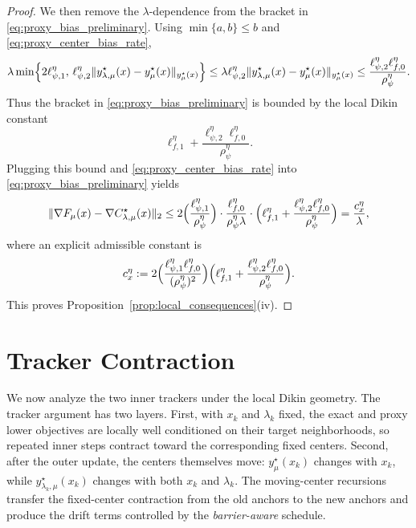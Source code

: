 \documentclass{article}
\begin{document}
\begin{proof}
\smallskip
\noindent We then remove the \(\lambda\)-dependence from the bracket in
\eqref{eq:proxy_bias_preliminary}.
Using \(\min\{a,b\}\le b\) and \eqref{eq:proxy_center_bias_rate},
\[
\lambda
\min\Bigl\{
2\ell_{\psi,1}^\eta,\,
\ell_{\psi,2}^\eta
\|y_{\lambda,\mu}^\star(x)-y_\mu^\star(x)\|_{y_\mu^\star(x)}
\Bigr\}
\le
\lambda\ell_{\psi,2}^\eta
\|y_{\lambda,\mu}^\star(x)-y_\mu^\star(x)\|_{y_\mu^\star(x)}
\le
\frac{\ell_{\psi,2}^\eta\ell_{f,0}^\eta}{\rho_\psi^\eta}.
\]
Thus the bracket in \eqref{eq:proxy_bias_preliminary} is bounded by the local Dikin constant
\[
\ell_{f,1}^\eta
+
\frac{\ell_{\psi,2}^\eta\ell_{f,0}^\eta}{\rho_\psi^\eta}.
\]
Plugging this bound and \eqref{eq:proxy_center_bias_rate} into
\eqref{eq:proxy_bias_preliminary} yields
\[
\|\nabla F_\mu(x)-\nabla C_{\lambda,\mu}^\star(x)\|_2
\le
2\Bigl(\frac{\ell_{\psi,1}^\eta}{\rho_\psi^\eta}\Bigr)
\cdot
\frac{\ell_{f,0}^\eta}{\rho_\psi^\eta\lambda}
\cdot
\Bigl(
\ell_{f,1}^\eta
+
\frac{\ell_{\psi,2}^\eta\ell_{f,0}^\eta}{\rho_\psi^\eta}
\Bigr)
=
\frac{c_x^\eta}{\lambda},
\]
where an explicit admissible constant is
\begin{equation}
\label{eq:cx_eta_explicit}
c_x^\eta
:=
2
\Bigl(
\frac{\ell_{\psi,1}^\eta\ell_{f,0}^\eta}{(\rho_\psi^\eta)^2}
\Bigr)
\Bigl(
\ell_{f,1}^\eta
+
\frac{\ell_{\psi,2}^\eta\ell_{f,0}^\eta}{\rho_\psi^\eta}
\Bigr).
\end{equation}
This proves Proposition~\ref{prop:local_consequences}\textup{(iv)}.
\end{proof}





\section{Tracker Contraction}
\label{app:tracker}

We now analyze the two inner trackers under the local Dikin geometry. The tracker argument has two
layers. First, with \(x_k\) and \(\lambda_k\) fixed, the exact and proxy lower objectives are locally
well conditioned on their target neighborhoods, so repeated inner steps contract toward the corresponding
fixed centers. Second, after the outer update, the centers themselves move:
\(y_\mu^\star(x_k)\) changes with \(x_k\), while
\(y_{\lambda_k,\mu}^\star(x_k)\) changes with both \(x_k\) and \(\lambda_k\). The moving-center
recursions transfer the fixed-center contraction from the old anchors to the new anchors and produce
the drift terms controlled by the \textit{barrier-aware} schedule.
\end{document}
